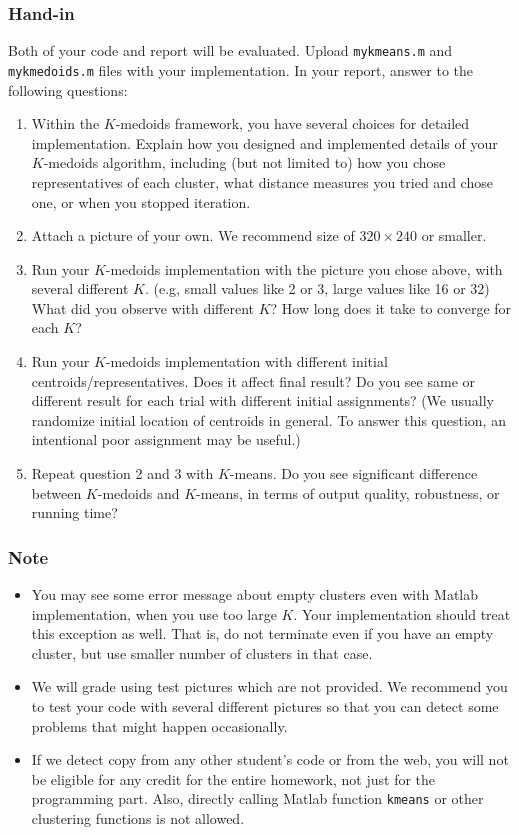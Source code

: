 \documentclass[twoside,10pt]{article}
\begin{document}
\subsubsection*{Hand-in}
Both of your code and report will be evaluated. Upload \texttt{mykmeans.m} and \texttt{mykmedoids.m} files with your implementation. In your report, answer to the following questions:
\begin{enumerate}
  \item Within the $K$-medoids framework, you have several choices for detailed implementation. Explain how you designed and implemented details of your $K$-medoids algorithm, including (but not limited to) how you chose representatives of each cluster, what distance measures you tried and chose one, or when you stopped iteration.
  \item Attach a picture of your own. We recommend size of $320 \times 240$ or smaller.
  \item Run your $K$-medoids implementation with the picture you chose above, with several different $K$. (e.g, small values like 2 or 3, large values like 16 or 32) What did you observe with different $K$? How long does it take to converge for each $K$?
  \item Run your $K$-medoids implementation with different initial centroids/representatives. Does it affect final result? Do you see same or different result for each trial with different initial assignments? (We usually randomize initial location of centroids in general. To answer this question, an intentional poor assignment may be useful.)
  \item Repeat question 2 and 3 with $K$-means. Do you see significant difference between $K$-medoids and $K$-means, in terms of output quality, robustness, or running time?
\end{enumerate}


\subsubsection*{Note}
\begin{itemize}
  \item You may see some error message about empty clusters even with Matlab implementation, when you use too large $K$. Your implementation should treat this exception as well. That is, do not terminate even if you have an empty cluster, but use smaller number of clusters in that case.

  \item We will grade using test pictures which are not provided. We recommend you to test your code with several different pictures so that you can detect some problems that might happen occasionally. 

  \item If we detect copy from any other student's code or from the web, you will not be eligible for any credit for the entire homework, not just for the programming part. Also, directly calling Matlab function \texttt{kmeans} or other clustering functions is not allowed.
\end{itemize}

%
%
\end{document}
